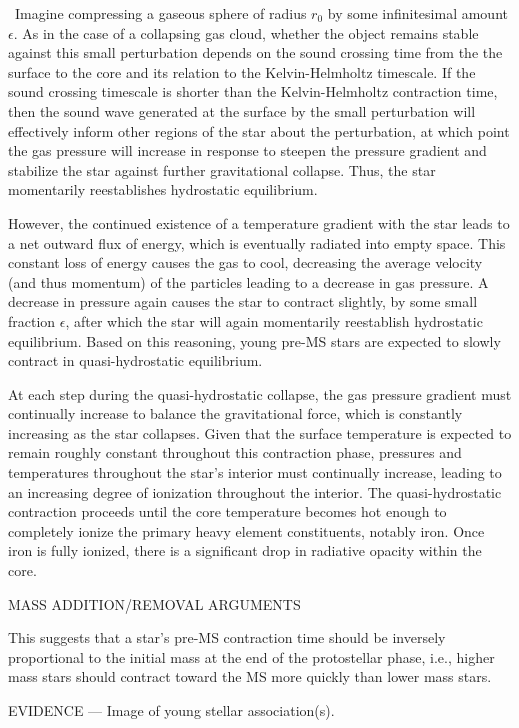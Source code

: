 \
Imagine compressing a gaseous sphere of radius $r_0$ by some infinitesimal amount $\epsilon$. As in the case of a collapsing gas cloud, whether the object remains stable against this small perturbation depends on the sound crossing time from the the surface to the core and its relation to the Kelvin-Helmholtz timescale. If the sound crossing timescale is shorter than the Kelvin-Helmholtz contraction time, then the sound wave generated at the surface by the small perturbation will effectively inform other regions of the star about the perturbation, at which point the gas pressure will increase in response to steepen the pressure gradient and stabilize the star against further gravitational collapse. Thus, the star momentarily reestablishes hydrostatic equilibrium. 

However, the continued existence of a temperature gradient with the star leads to a net outward flux of energy, which is eventually radiated into empty space. This constant loss of energy causes the gas to cool, decreasing the average velocity (and thus momentum) of the particles leading to a decrease in gas pressure. A decrease in pressure again causes the star to contract slightly, by some small fraction $\epsilon$, after which the star will again momentarily reestablish hydrostatic equilibrium. Based on this reasoning, young pre-MS stars are expected to slowly contract in quasi-hydrostatic equilibrium.

At each step during the quasi-hydrostatic collapse, the gas pressure gradient must continually increase to balance the gravitational force, which is constantly increasing as the star collapses. Given that the surface temperature is expected to remain roughly constant throughout this contraction phase, pressures and temperatures throughout the star's interior must continually increase, leading to an increasing degree of ionization throughout the interior. The quasi-hydrostatic contraction proceeds until the core temperature becomes hot enough to completely ionize the primary heavy element constituents, notably iron. Once iron is fully ionized, there is a significant drop in radiative opacity within the core. 

MASS ADDITION/REMOVAL ARGUMENTS

This suggests that a star's pre-MS contraction time should be inversely proportional to the initial mass at the end of the protostellar phase, i.e., higher mass stars should contract toward the MS more quickly than lower mass stars. 

EVIDENCE --- Image of young stellar association(s).

